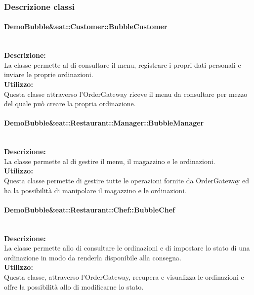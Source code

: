 \subsubsection{Descrizione classi}

\paragraph{DemoBubble\&eat\-::Customer\-::Bubble\-Customer}\label{eat-customer}\mbox{}\\
\textbf{Descrizione:}\\
La classe permette al \Customer{} di consultare il menu, registrare i propri dati personali e inviare le proprie ordinazioni.\\
\textbf{Utilizzo:}\\
Questa classe attraverso l'Order\-Gateway riceve il menu da consultare per mezzo del quale può creare la propria ordinazione.

\paragraph{Demo\-Bubble\&eat\-::Restaurant\-::Manager\-::Bubble\-Manager}\label{eat-manager}\mbox{}\\
\textbf{Descrizione:}\\
La classe permette al \Manager{} di gestire il menu, il magazzino e le ordinazioni.\\
\textbf{Utilizzo:}\\
Questa classe permette di gestire tutte le operazioni fornite da Order\-Gateway ed ha la possibilità di manipolare il magazzino e le ordinazioni.

\paragraph{Demo\-Bubble\&eat\-::Restaurant\-::Chef\-::Bubble\-Chef}\label{eat-chef}\mbox{}\\
\textbf{Descrizione:}\\
La classe permette allo \Chef{} di consultare le ordinazioni e di impostare lo stato di una ordinazione in modo da renderla disponibile alla consegna.\\
\textbf{Utilizzo:}\\
Questa classe, attraverso l'Order\-Gateway, recupera e visualizza le ordinazioni e offre la possibilità allo \Chef{} di modificarne lo stato.

